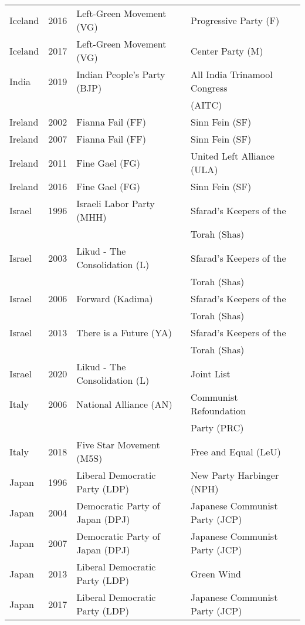 {\begin{longtable}{|l|c|l|l|}
  Iceland & 2016 &   Left-Green Movement (VG) &   Progressive Party (F) \\ 
  Iceland & 2017 &   Left-Green Movement (VG) &   Center Party (M) \\ 
  India & 2019 &  Indian People's Party (BJP)   &  All India Trinamool Congress   \\ 
          & &      &    (AITC) \\ 
  Ireland & 2002 &   Fianna Fail (FF) &   Sinn Fein (SF) \\ 
  Ireland & 2007 &   Fianna Fail (FF) &   Sinn Fein (SF) \\ 
  Ireland & 2011 &   Fine Gael (FG) &   United Left Alliance (ULA) \\ 
  Ireland & 2016 &   Fine Gael (FG) &   Sinn Fein (SF) \\ 
  Israel & 1996 &   Israeli Labor Party (MHH) &   Sfarad's Keepers of the   \\ 
         &       &   &     Torah (Shas) \\ 
  Israel & 2003 &   Likud - The Consolidation (L) &   Sfarad's Keepers of the  \\ 
         &       &   &     Torah (Shas) \\ 
  Israel & 2006 &   Forward (Kadima) &   Sfarad's Keepers of the   \\ 
         &       &   &     Torah (Shas) \\ 
  Israel & 2013 &   There is a Future (YA) &   Sfarad's Keepers of the   \\ 
         &       &   &     Torah (Shas) \\ 
  Israel & 2020 &   Likud - The Consolidation (L) &   Joint List   \\ 
  Italy & 2006 &   National Alliance (AN)   &   Communist Refoundation   \\ 
         &   &      &    Party (PRC) \\ 
  Italy & 2018 &   Five Star Movement (M5S) &   Free and Equal (LeU) \\ 
  Japan & 1996 &   Liberal Democratic Party (LDP) &   New Party Harbinger (NPH) \\ 
  Japan & 2004 &   Democratic Party of Japan (DPJ)   &   Japanese Communist Party (JCP) \\ 
  Japan & 2007 &   Democratic Party of Japan (DPJ)   &   Japanese Communist Party (JCP) \\ 
  Japan & 2013 &   Liberal Democratic Party (LDP) &   Green Wind \\ 
  Japan & 2017 &   Liberal Democratic Party (LDP) &   Japanese Communist Party (JCP) \\ 

\end{longtable}}
